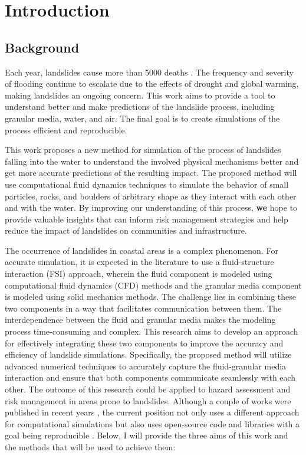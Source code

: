 \chapter{Introduction} \label{chap:intro}

\section{Background}

Each year, landslides cause more than 5000 deaths \cite{perkins2012death}. The frequency and severity of flooding continue to escalate due to the effects of drought and global warming, making landslides an ongoing concern. This work aims to provide a tool to understand better and make predictions of the landslide process, including granular media, water, and air. The final goal is to create simulations of the process efficient and reproducible. 

This work proposes a new method for simulation of the process of landslides falling into the water to understand the involved physical mechanisms better and get more accurate predictions of the resulting impact. The proposed method will use computational fluid dynamics techniques to simulate the behavior of small particles, rocks, and boulders of arbitrary shape as they interact with each other and with the water. By improving our understanding of this process, \textbf{we} hope to provide valuable insights that can inform risk management strategies and help reduce the impact of landslides on communities and infrastructure.

The occurrence of landslides in coastal areas is a complex phenomenon. For accurate simulation, it is expected in the literature to use a fluid-structure interaction (FSI) \cite{belytschko1980fsi} approach, wherein the fluid component is modeled using computational fluid dynamics (CFD) methods and the granular media component is modeled using solid mechanics methods. The challenge lies in combining these two components in a way that facilitates communication between them. The interdependence between the fluid and granular media makes the modeling process time-consuming and complex. This research aims to develop an approach for effectively integrating these two components to improve the accuracy and efficiency of landslide simulations. Specifically, the proposed method will utilize advanced numerical techniques to accurately capture the fluid-granular media interaction and ensure that both components communicate seamlessly with each other. The outcome of this research could be applied to hazard assessment and risk management in areas prone to landslides. Although a couple of works were published in recent years \cite{mao2020resolved} \cite{shen2022resolved}, the current position not only uses a different approach for computational simulations but also uses open-source code and libraries with a goal being reproducible \cite{NAS2019}. Below, I will provide the three aims of this work and the methods that will be used to achieve them:

